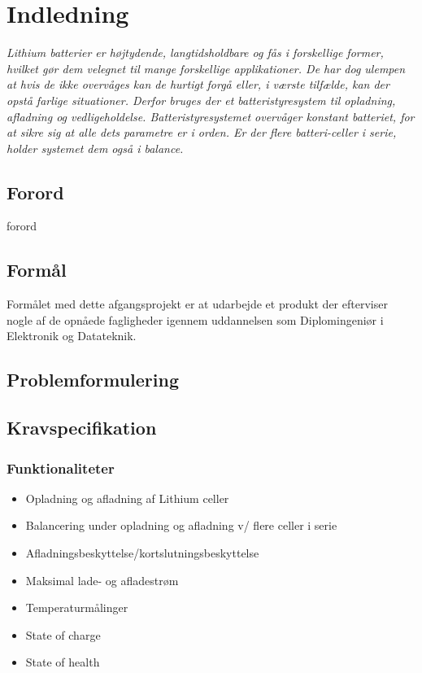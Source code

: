 \chapter{Indledning}

\emph{Lithium batterier er højtydende, langtidsholdbare og fås i forskellige former, hvilket gør dem velegnet til mange forskellige applikationer. De har dog ulempen at hvis de ikke overvåges kan de hurtigt forgå eller, i værste tilfælde, kan der opstå farlige situationer. Derfor bruges der et batteristyresystem til opladning, afladning og vedligeholdelse. Batteristyresystemet overvåger konstant batteriet, for at sikre sig at alle dets parametre er i orden. Er der flere batteri-celler i serie, holder systemet dem også i balance. }

\section{Forord}\label{sec:forord}
forord

\section{Formål}
Formålet med dette afgangsprojekt er at udarbejde et produkt der efterviser nogle af de opnåede fagligheder igennem uddannelsen som Diplomingeniør i Elektronik og Datateknik.

\section{Problemformulering}


\section{Kravspecifikation} \label{afs:kravspecifikation}

\subsection{Funktionaliteter}

\begin{itemize}
\item Opladning og afladning af Lithium celler
\item Balancering under opladning og afladning v/ flere celler i serie
\item Afladningsbeskyttelse/kortslutningsbeskyttelse
\item Maksimal lade- og afladestrøm
\item Temperaturmålinger
\item State of charge
\item State of health
\end{itemize}

